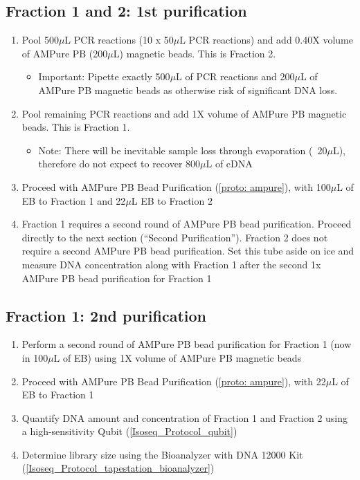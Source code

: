 \subsection{Fraction 1 and 2: 1st purification}
\begin{enumerate}
	\item Pool 500$\mu$L PCR reactions (10 x 50$\mu$L PCR reactions) and add 0.40X volume of AMPure PB (200$\mu$L) magnetic beads. This is Fraction 2.
	\begin{itemize}
		\item Important: Pipette exactly 500$\mu$L of PCR reactions and 200$\mu$L of AMPure PB magnetic beads as otherwise risk of significant DNA loss.
	\end{itemize}
	\item Pool remaining PCR reactions and add 1X volume of AMPure PB magnetic beads. This is Fraction 1. 
	\begin{itemize}
		\item Note: There will be inevitable sample loss through evaporation (~20$\mu$L), therefore do not expect to recover 800$\mu$L of cDNA 
	\end{itemize}
	\item Proceed with AMPure PB Bead Purification (\cref{proto: ampure}), with 100$\mu$L of EB to Fraction 1 and 22$\mu$L EB to Fraction 2 
	\item Fraction 1 requires a second round of AMPure PB bead purification. Proceed directly to the next section (“Second Purification”). Fraction 2 does not require a second AMPure PB bead purification. Set this tube aside on ice and measure DNA concentration along with Fraction 1 after the second 1x AMPure PB bead purification for Fraction 1 
\end{enumerate}

\subsection{Fraction 1: 2nd purification}
\begin{enumerate}
	\item Perform a second round of AMPure PB bead purification for Fraction 1 (now in 100$\mu$L of EB) using 1X volume of AMPure PB magnetic beads
	\item Proceed with AMPure PB Bead Purification (\cref{proto: ampure}), with 22$\mu$L of EB to Fraction 1
	\item Quantify DNA amount and concentration of Fraction 1 and Fraction 2 using a high-sensitivity Qubit (\cref{Isoseq_Protocol_qubit})
	\item Determine library size using the Bioanalyzer with DNA 12000 Kit (\cref{Isoseq_Protocol_tapestation_bioanalyzer}) 
\end{enumerate}

